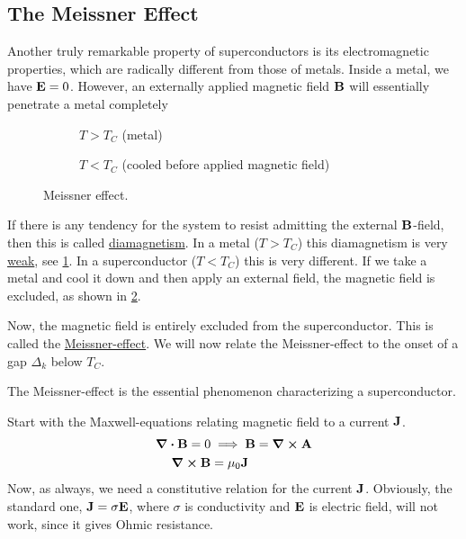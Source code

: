 \subsection{The Meissner Effect}
Another truly remarkable property of superconductors is its electromagnetic properties, which are radically different from those of metals.
Inside a metal, we have $\vb E = 0$. However, an externally applied magnetic field $\vb B$ will essentially penetrate a metal completely

\begin{figure}
	\centering
	\begin{subfigure}{0.45\textwidth}
		\centering
		
		\caption{$T>T_C$ (metal)}
		\label{fig:meissn_a}
	\end{subfigure}
	\begin{subfigure}{0.45\textwidth}
		\centering
		
		\caption{$T<T_C$ (cooled before applied magnetic field)}
		\label{fig:meissn_b}
	\end{subfigure}	
	\caption{Meissner effect.}
	\label{fig:meissner_1}
\end{figure}
If there is any tendency for the system to resist admitting the external $\vb B$-field, then this is called \underline{diamagnetism}. In a metal ($T>T_C$) this diamagnetism is very \underline{weak}, see \cref{fig:meissn_a}. In a superconductor ($T<T_C$) this is very different. If we take a metal and cool it down and then apply an external field, the magnetic field is excluded, as shown in \cref{fig:meissn_b}.


Now, the magnetic field is entirely excluded from the superconductor. This is called the \underline{Meissner-effect}. 
We will now relate the Meissner-effect to the onset of a gap $\Delta_k$ below $T_C$. 
\begin{tcolorbox}
	The Meissner-effect is the essential phenomenon characterizing a superconductor.
\end{tcolorbox}
Start with the Maxwell-equations relating magnetic field to a current $\vb J$.
\begin{align}
	\div{\vb B} = 0 &\implies \vb B =\curl{\vb A} \\
	\curl{\vb B} &= \mu_0\vb J	
\end{align}
Now, as always, we need a constitutive relation for the current $\vb J$. Obviously, the standard one, $\vb J = \sigma \vb E$, where $\sigma$ is conductivity and $\vb E$ is electric field, will not work, since it gives Ohmic resistance.

